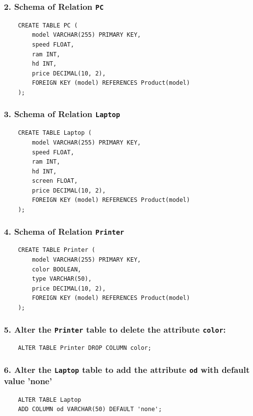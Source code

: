\documentclass{cshwk}
\begin{document}
\subsubsection*{2. Schema of Relation \texttt{PC}}
\begin{verbatim}
    CREATE TABLE PC (
        model VARCHAR(255) PRIMARY KEY,
        speed FLOAT,
        ram INT,
        hd INT,
        price DECIMAL(10, 2),
        FOREIGN KEY (model) REFERENCES Product(model)
    );    
\end{verbatim}

\subsubsection*{3. Schema of Relation \texttt{Laptop}}
\begin{verbatim}
    CREATE TABLE Laptop (
        model VARCHAR(255) PRIMARY KEY,
        speed FLOAT,
        ram INT,
        hd INT,
        screen FLOAT,
        price DECIMAL(10, 2),
        FOREIGN KEY (model) REFERENCES Product(model)
    );
\end{verbatim}

\subsubsection*{4. Schema of Relation \texttt{Printer}}
\begin{verbatim}
    CREATE TABLE Printer (
        model VARCHAR(255) PRIMARY KEY,
        color BOOLEAN,
        type VARCHAR(50),
        price DECIMAL(10, 2),
        FOREIGN KEY (model) REFERENCES Product(model)
    );
\end{verbatim}

\subsubsection*{5. Alter the \texttt{Printer} table to delete the attribute \texttt{color}: }
\begin{verbatim}
    ALTER TABLE Printer DROP COLUMN color;    
\end{verbatim}

\subsubsection*{6. Alter the \texttt{Laptop} table to add the attribute \texttt{od} with default value 'none'}

\begin{verbatim}
    ALTER TABLE Laptop
    ADD COLUMN od VARCHAR(50) DEFAULT 'none';
\end{verbatim}
\end{document}

